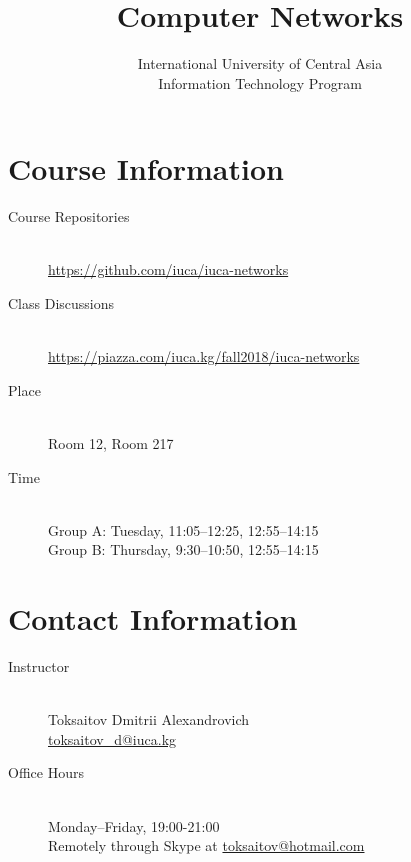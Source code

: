 \documentclass[12pt,a4paper,oneside]{article}
\begin{document}
    \title{Computer Networks}
    \author{
        International University of Central Asia\\
        Information Technology Program
    }
    \date{}
    \maketitle

    \section{Course Information}

        \begin{description}
            \item[Course Repositories]\hfill\\
                \url{https://github.com/iuca/iuca-networks}
            \item[Class Discussions]\hfill\\
                \url{https://piazza.com/iuca.kg/fall2018/iuca-networks}
            \item[Place]\hfill\\
                Room 12, Room 217
            \item[Time]\hfill\\
                Group A: Tuesday, 11:05--12:25, 12:55--14:15\\
                Group B: Thursday, 9:30--10:50, 12:55--14:15
        \end{description}

    \section{Contact Information}

        \begin{description}
            \item[Instructor]\hfill\\
                Toksaitov Dmitrii Alexandrovich\\
                \href{mailto:toksaitov_d@iuca.kg}{toksaitov\_d@iuca.kg}
            \item[Office Hours]\hfill\\
                Monday--Friday, 19:00-21:00\\
                Remotely through Skype at \href{mailto:toksaitov@hotmail.com}{toksaitov@hotmail.com}
        \end{description}
\end{document}

